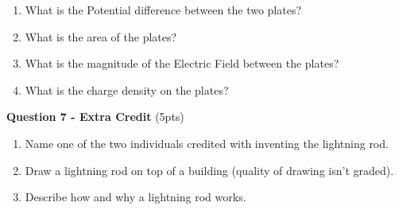 \documentclass[14pt]{report}
\begin{document}
\begin{enumerate}[label=\Alph*]
\item What is the Potential difference between the two plates?
\item What is the area of the plates?
\item What is the magnitude of the Electric Field between the plates?
\item What is the charge density on the plates?
\end{enumerate}

\textbf{Question 7 - Extra Credit} (5pts)
\begin{enumerate}[label=\Alph*]
\item Name one of the two individuals credited with inventing the lightning rod.
\item Draw a lightning rod on top of a building (quality of drawing isn't graded).
\item Describe how and why a lightning rod works.
\end{enumerate}
 
\end{document}
